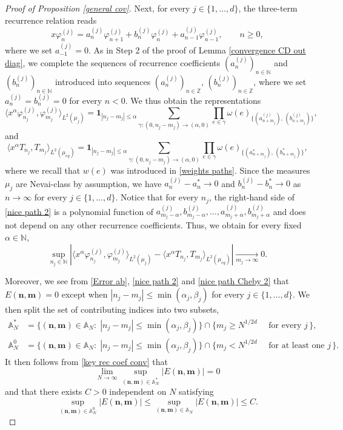 \documentclass[a4paper,11pt]{article}
\numberwithin{equation}{section}
\theoremstyle{definition}
\newcommand{\rev}[1]{#1}
\newcommand{\eq}{\begin{equation}}
\newcommand{\qe}{\end{equation}}
\newcommand{\N}{\mathbb{N}}
\newcommand{\Z}{\mathbb{Z}}
\newcommand{\bs}{\boldsymbol}
\newcommand{\bv}{\mathbf}
\renewcommand{\leq}{\leqslant}
\renewcommand{\geq}{\geqslant}
\renewcommand{\phi}{\varphi}
\begin{document}
\begin{proof}[Proof of Proposition \ref{general cov}]
Next, for every $j\in\{1,\ldots,d\}$, the three-term recurrence relation reads
\eq
x\phi_n^{(j)}=a_n^{(j)}\phi_{n+1}^{(j)}+b_n^{(j)}\phi_n^{(j)}+a_{n-1}^{(j)}\phi_{n-1}^{(j)},\qquad n\geq 0,
\qe
where we set  $a_{-1}^{(j)}=0$. As in Step 2 of the proof of Lemma
\ref{convergence CD out diag}, we complete  the sequences of recurrence
coefficients $(a_n^{(j)})_{n\in\N}$ and $(b_n^{(j)})_{n\in\N}$ introduced into
sequences $(a_n^{(j)})_{n\in\Z}$, $(b_n^{(j)})_{n\in\Z}$, where we set
$a_n^{(j)}=b_n^{(j)}=0$ for every $n<0$. We thus obtain the representations
\eq
\label{nice path 2}
\langle x^{\alpha}\phi^{(j)}_{n_j},\phi^{(j)}_{m_j}\rangle_{L^2(\mu_j)}=\bv 1_{|n_j-m_j|\leq \alpha} \sum_{\gamma:(0,n_j-m_j)\rightarrow (\alpha,0)} \prod_{e\in\gamma}\omega(e)_{\{(a^{(j)}_{n+m_j}),\,(b^{(j)}_{n+m_j})\}},
\qe
and
\eq
\label{nice path Cheby 2}
\langle x^{\alpha}T_{n_j},T_{m_j}\rangle_{L^2(\mu_{eq})}=\bv 1_{|n_j-m_j|\leq \alpha} \sum_{\gamma:(0,n_j-m_j)\rightarrow (\alpha,0)} \prod_{e\in\gamma}\omega(e)_{\{(a^*_{n+m_j}),\,(b^*_{n+m_j})\}},
\qe
\rev{where we recall that $w(e)$ was introduced in \eqref{weights paths}.}
Since the measures $\mu_j$ are Nevai-class by assumption, we have
$a_n^{(j)}-a_n^*\to 0$ and $b_n^{(j)}-b_n^*\to 0$ as $n\to\infty$ for every
$j\in\{1,\ldots,d\}$. Notice that for every $n_j$, the right-hand side of
\eqref{nice path 2} is a polynomial function of
$a_{m_j-\alpha}^{(j)},b_{m_j-\alpha}^{(j)},\ldots,a_{m_j+\alpha}^{(j)},b_{m_j+\alpha}^{(j)}$
and does not depend on any other recurrence coefficients. Thus, we obtain for every fixed $\alpha\in\N$,
\eq
\label{key rec coef conv}
\sup_{n_j\in\N}\left|\langle x^{\alpha}\phi^{(j)}_{n_j},\phi^{(j)}_{m_j}\rangle_{L^2(\mu_j)} - \langle x^{\alpha}T_{n_j},T_{m_j}\rangle_{L^2(\mu_{eq})}\right|\xrightarrow[m_j\to\infty]{} 0.
\qe

Moreover, we see from \eqref{Error ab}, \eqref{nice path 2} and \eqref{nice path Cheby 2} that $E(\bs n,\bs m)=0$ except when $|n_j-m_j|\leq \min(\alpha_j,\beta_j)$ for every $j\in\{1,\ldots,d\}$. We then split the set of contributing indices into two subsets,
\begin{align*}
\mathbb A_N^{*}& =\Big\{ (\bs n,\bs m)\in\mathbb A_N :\;|n_j-m_j|\leq \min(\alpha_j,\beta_j)\Big\} \cap \Big \{m_j\geq N^{1/2d}\quad \mbox{ for every } j\,\Big\},\\
\mathbb A_N^{0}& =\Big\{ (\bs n,\bs m)\in\mathbb A_N :\;|n_j-m_j|\leq \min(\alpha_j,\beta_j)\Big\}\cap \Big\{ m_j< N^{1/2d}\quad \mbox{ for at least one } j\, \Big\}.
\end{align*}
It then follows from \eqref{key rec coef conv} that
\eq
\label{control E 1}
\lim_{N\to\infty}\sup_{(\bs n,\bs m)\in\mathbb A_N^*}\big|E(\bs n,\bs m)\big| =0
\qe
and that there exists $C>0$ independent on $N$ satisfying
\eq
\label{control E 2}
\sup_{(\bs n,\bs m)\in\mathbb A_N^0}\big|E(\bs n,\bs m)\big|\leq\sup_{(\bs n,\bs m)\in\mathbb A_N}\big|E(\bs n,\bs m)\big| \leq C.
\qe


\end{proof}
\end{document}
